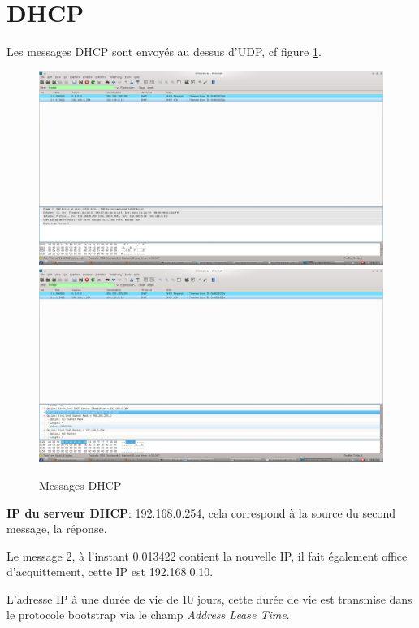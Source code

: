 \documentclass[12pt,a4paper,openany]{article}
\begin{document}
	\maketitle
	\section{DHCP}
	Les messages DHCP sont envoyés au dessus d'UDP, cf figure \ref{fig:dhcpudp}.
	\begin{figure}[H]
		\centering
		\includegraphics[width=15cm]{capture1.jpeg}
		\includegraphics[width=15cm]{capture2.jpeg}
		\label{fig:dhcpudp}
		\caption{Messages DHCP}
	\end{figure}

	\textbf{IP du serveur DHCP}: 192.168.0.254, cela correspond à la source du second message, la réponse.

	Le message \No{}2, à l'instant 0.013422 contient la nouvelle IP, il fait également office d'acquittement, cette IP est 192.168.0.10.

	L'adresse IP à une durée de vie de 10 jours, cette durée de vie est transmise dans le protocole bootstrap via le champ \textit{Address Lease Time}.
\end{document}
